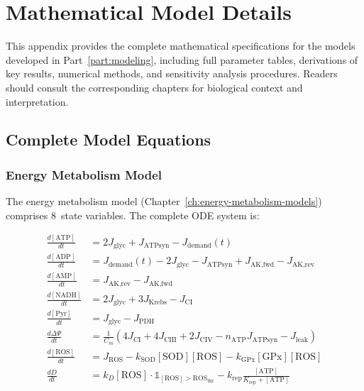 \chapter{Mathematical Model Details}
\label{app:mathematical-details}

This appendix provides the complete mathematical specifications for the models developed in Part~\ref{part:modeling}, including full parameter tables, derivations of key results, numerical methods, and sensitivity analysis procedures. Readers should consult the corresponding chapters for biological context and interpretation.

\section{Complete Model Equations}
\label{sec:complete-equations}

\subsection{Energy Metabolism Model}

The energy metabolism model (Chapter~\ref{ch:energy-metabolism-models}) comprises 8~state variables. The complete ODE system is:

\begin{align}
\frac{d[\text{ATP}]}{dt} &= 2 J_{\text{glyc}} + J_{\text{ATPsyn}} - J_{\text{demand}}(t) \label{eq:app-atp} \\
\frac{d[\text{ADP}]}{dt} &= J_{\text{demand}}(t) - 2 J_{\text{glyc}} - J_{\text{ATPsyn}} + J_{\text{AK,fwd}} - J_{\text{AK,rev}} \label{eq:app-adp} \\
\frac{d[\text{AMP}]}{dt} &= J_{\text{AK,rev}} - J_{\text{AK,fwd}} \label{eq:app-amp} \\
\frac{d[\text{NADH}]}{dt} &= 2 J_{\text{glyc}} + 3 J_{\text{Krebs}} - J_{\text{CI}} \label{eq:app-nadh} \\
\frac{d[\text{Pyr}]}{dt} &= J_{\text{glyc}} - J_{\text{PDH}} \label{eq:app-pyr} \\
\frac{d\Delta\Psi}{dt} &= \frac{1}{C_m}(4 J_{\text{CI}} + 4 J_{\text{CIII}} + 2 J_{\text{CIV}} - n_{\text{ATP}} J_{\text{ATPsyn}} - J_{\text{leak}}) \label{eq:app-psi} \\
\frac{d[\text{ROS}]}{dt} &= J_{\text{ROS}} - k_{\text{SOD}}[\text{SOD}][\text{ROS}] - k_{\text{GPx}}[\text{GPx}][\text{ROS}] \label{eq:app-ros} \\
\frac{dD}{dt} &= k_D [\text{ROS}] \cdot \mathbb{1}_{[\text{ROS}]>\text{ROS}_{\text{thr}}} - k_{\text{rep}} \frac{[\text{ATP}]}{K_{\text{rep}} + [\text{ATP}]} \label{eq:app-damage}
\end{align}

